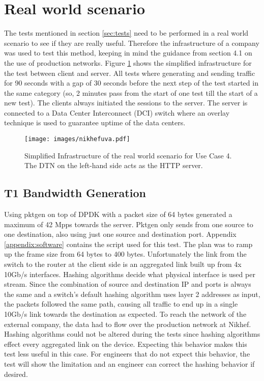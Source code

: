 \section{Real world scenario}
The tests mentioned in section \ref{sec:tests} need to be performed in a real world scenario to see if they are really useful. 
Therefore the infrastructure of a company was used to test this method, keeping in mind the guidance from section 4.1 on the use of production networks.
Figure \ref{fig:nikhefuva} shows the simplified infrastructure for the test between client and server. All tests where generating and sending traffic for 90 seconds with a gap of 30 seconds before the next step of the test started in the same category (so, 2 minutes pass from the start of one test till the start of a new test). The clients always initiated the sessions to the server. The server is connected to a Data Center Interconnect (DCI) switch where an overlay technique is used to guarantee uptime of the data centers. 

\begin{figure}
  \texttt{[image: images/nikhefuva.pdf]}
  \caption{Simplified Infrastructure of the real world scenario for Use Case 4. The DTN on the left-hand side acts as the HTTP server.}
  \label{fig:nikhefuva}
\end{figure}

\subsection{T1 Bandwidth Generation}
Using pktgen on top of DPDK with a packet size of 64 bytes generated a maximum of 42 Mpps towards the server. 
Pktgen only sends from one source to one destination, also using just one source and destination port. 
Appendix \ref{appendix:software} contains the script used for this test. The plan was to ramp up the frame size from 64 bytes to 400 bytes. Unfortunately the link from the switch to the router at the client side is an aggregated link built up from 4x 10Gb/s interfaces. 
Hashing algorithms \cite{hashing} decide what physical interface is used per stream. Since the combination of source and destination IP and ports is always the same and a switch's default hashing algorithm uses layer 2 addresses as input, the packets followed the same path, causing all traffic to end up in a single 10Gb/s link towards the destination as expected. 
To reach the network of the external company, the data had to flow over the production network at Nikhef. Hashing algorithms could not be altered during the tests since hashing algorithms effect every aggregated link on the device. 
Expecting this behavior makes this test less useful in this case. For engineers that do not expect this behavior, the test will show the limitation and an engineer can correct the hashing behavior if desired.

